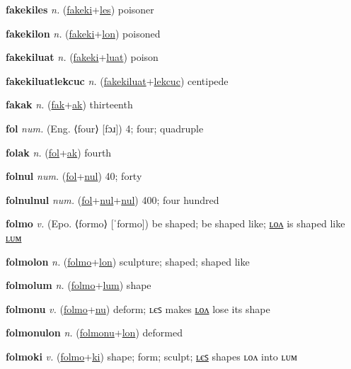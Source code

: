 \textbf{\hypertarget{fakekiles}{fakekiles}} \textit{n.} (\hyperlink{fakeki}{fakeki}+\allowbreak \hyperlink{les}{les})
poisoner

\textbf{\hypertarget{fakekilon}{fakekilon}} \textit{n.} (\hyperlink{fakeki}{fakeki}+\allowbreak \hyperlink{lon}{lon})
poisoned

\textbf{\hypertarget{fakekiluat}{fakekiluat}} \textit{n.} (\hyperlink{fakeki}{fakeki}+\allowbreak \hyperlink{luat}{luat})
poison

\textbf{\hypertarget{fakekiluatlekcuc}{fakekiluatlekcuc}} \textit{n.} (\hyperlink{fakekiluat}{fakekiluat}+\allowbreak \hyperlink{lekcuc}{lekcuc})
centipede

\textbf{\hypertarget{fakak}{fakak}} \textit{n.} (\hyperlink{fak}{fak}+\allowbreak \hyperlink{ak}{ak})
thirteenth

\textbf{\hypertarget{fol}{fol}} \textit{num.} (Eng. ⟨four⟩ [fɔɹ])
4; four; quadruple

\textbf{\hypertarget{folak}{folak}} \textit{n.} (\hyperlink{fol}{fol}+\allowbreak \hyperlink{ak}{ak})
fourth

\textbf{\hypertarget{folnul}{folnul}} \textit{num.} (\hyperlink{fol}{fol}+\allowbreak \hyperlink{nul}{nul})
40; forty

\textbf{\hypertarget{folnulnul}{folnulnul}} \textit{num.} (\hyperlink{fol}{fol}+\allowbreak \hyperlink{nul}{nul}+\allowbreak \hyperlink{nul}{nul})
400; four hundred

\textbf{\hypertarget{folmo}{folmo}} \textit{v.} (Epo. ⟨formo⟩ [ˈformo])
be shaped; be shaped like; \hyperlink{folmolon}{ʟᴏᴧ} is shaped like \hyperlink{folmolum}{ʟᴜᴍ}

\textbf{\hypertarget{folmolon}{folmolon}} \textit{n.} (\hyperlink{folmo}{folmo}+\allowbreak \hyperlink{lon}{lon})
sculpture; shaped; shaped like

\textbf{\hypertarget{folmolum}{folmolum}} \textit{n.} (\hyperlink{folmo}{folmo}+\allowbreak \hyperlink{lum}{lum})
shape

\textbf{\hypertarget{folmonu}{folmonu}} \textit{v.} (\hyperlink{folmo}{folmo}+\allowbreak \hyperlink{nu}{nu})
deform; ʟєꜱ makes \hyperlink{folmonulon}{ʟᴏᴧ} lose its shape

\textbf{\hypertarget{folmonulon}{folmonulon}} \textit{n.} (\hyperlink{folmonu}{folmonu}+\allowbreak \hyperlink{lon}{lon})
deformed

\textbf{\hypertarget{folmoki}{folmoki}} \textit{v.} (\hyperlink{folmo}{folmo}+\allowbreak \hyperlink{ki}{ki})
shape; form; sculpt; \hyperlink{folmokiles}{ʟєꜱ} shapes ʟᴏᴧ into ʟᴜᴍ

